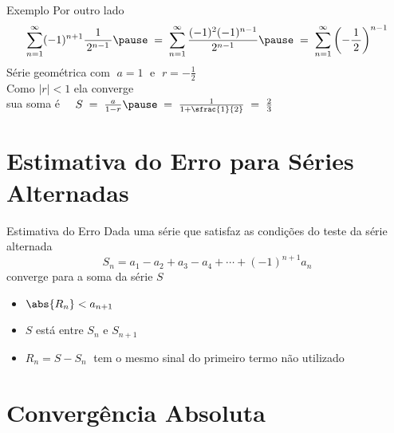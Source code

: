 \documentclass[fleqn,utf8,aspectratio=169,12pt]{beamer}
\begin{document}
\begin{frame}{Exemplo \theexemplo}
  Por outro lado
  \[
    \sum_{n=1}^{\infty} (-1)^{n+1} \frac{1}{\,2^{n-1}\,}
    \pause
    \;=\; \sum_{n=1}^{\infty} \frac{(-1)^2(-1)^{n-1}}{\,2^{n-1}\,}
    \pause
    \;=\; \sum_{n=1}^{\infty} \left( -\frac{1}{\,2\,} \right)^{n-1}
  \]
  \pause
  Série geométrica com $\;a=1\;$ e \(\;r=-\frac{1}{2}\;\) \\[5mm]

  \pause
  \vspace{0.5\baselineskip}
  Como $|r|<1$ ela converge \\[5mm]

  \pause
  sua soma é
  \(\quad
    S \;=\; \frac{a}{1-r}
      \pause
      \;=\; \frac{1}{1+\sfrac{1}{2}}
      \;=\; \frac{2}{3}
  \)

\end{frame}


\section{Estimativa do Erro para Séries Alternadas}

\begin{frame}{Estimativa do Erro}
  Dada uma série que satisfaz as condições do teste da série alternada
  \pause
  \[ S_n = a_1 - a_2 + a_3 - a_4 + \cdots + (-1)^{n+1}a_n \]
  converge para a soma da série $S$
  \pause
  \begin{itemize}[<+->]
    \item \( \abs{R_n} < a_{n+1} \)
    \item $S$ está entre $S_n$ e $S_{n+1}$
    \item \( R_n = S - S_n \;\) tem o mesmo sinal do primeiro termo não utilizado
  \end{itemize}
\end{frame}

\section{Convergência Absoluta}
\end{document}
